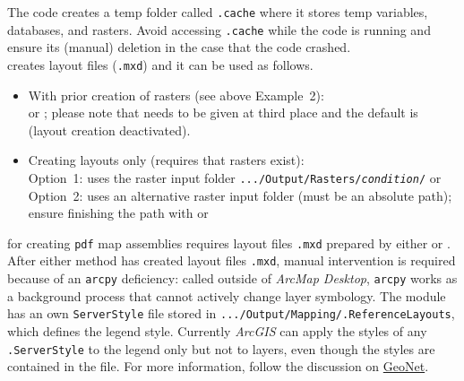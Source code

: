 The code creates a temp folder called \texttt{.cache} where it stores temp variables, databases, and rasters. Avoid accessing \texttt{.cache} while the code is running and ensure its (manual) deletion in the case that the code crashed.\\

 creates layout files (\texttt{.mxd}) and it can be used as follows.
\begin{itemize}
	\item With prior creation of rasters (see above Example~2):\\
	 or ; please note that  needs to be given at third place and the default is  (layout creation deactivated).
	\item Creating layouts only (requires that rasters exist):\\
	Option~1:  uses the raster input folder \texttt{.../Output/Rasters/\textit{condition}/} or \\
	Option~2:  uses an alternative raster input folder (must be an absolute path); ensure finishing the path with  or 
\end{itemize}

 for creating \texttt{pdf} map assemblies requires layout files \texttt{.mxd} prepared by either  or . After either method has created layout files \texttt{.mxd}, manual intervention is required because of an \texttt{arcpy} deficiency: called outside of \textit{ArcMap Desktop}, \texttt{arcpy} works as a background process that cannot actively change layer symbology. The module has an own \texttt{ServerStyle} file stored in \texttt{.../Output/Mapping/.ReferenceLayouts}, which defines the legend style. Currently \textit{ArcGIS} can apply the styles of any \texttt{.ServerStyle} to the legend only but not to layers, even though the styles are contained in the file. For more information, follow the discussion on \href{https://community.esri.com/thread/210442-how-do-i-apply-arcpymappingupdatelayer-to-a-mapdocument-in-a-background-process}{GeoNet}.\\


